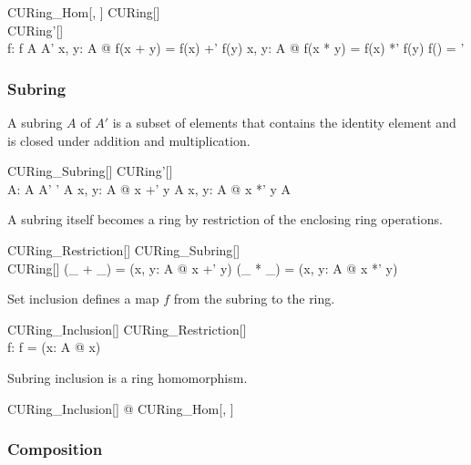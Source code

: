 \documentclass{amsart}
\begin{document}
\begin{schema}{CURing\_Hom}[\genT, \genU]
	CURing[\genT] \\
	CURing'[\genU] \\
	f: \genT \pfun \genU
\where
	f \in A \fun A'
\also
	\forall x, y: A @ f(x + y) = f(x) +' f(y)
\also
	\forall x, y: A @ f(x * y) = f(x) *' f(y)
\also
	f(\ringOne) = \ringOne'
\end{schema}

\subsubsection{Subring}

A subring $A$ of $A'$ is a subset of elements that contains the identity element and is closed under
addition and multiplication.

\begin{schema}{CURing\_Subring}[\genT]
	CURing'[\genT] \\
	A: \power \genT
\where
	A \subseteq A'
\also
	\ringOne' \in A
\also
	\forall x, y: A @ x +' y \in A
\also
	\forall x, y: A @ x *' y \in A	
\end{schema}

A subring itself becomes a ring by restriction of the enclosing ring operations.

\begin{schema}{CURing\_Restriction}[\genT]
	CURing\_Subring[\genT] \\
	CURing[\genT]
\where
	(\_ + \_) = (\lambda x, y: A @ x +' y)
\also
	(\_ * \_) = (\lambda x, y: A @ x *' y)
\end{schema}

Set inclusion defines a map $f$ from the subring to the ring.

\begin{schema}{CURing\_Inclusion}[\genT]
	CURing\_Restriction[\genT] \\
	f: \genT \pfun \genT
\where
	f = (\lambda x: A @ x)
\end{schema}

\begin{remark}
Subring inclusion is a ring homomorphism.

\begin{zed}
\forall CURing\_Inclusion[\setT] @ CURing\_Hom[\setT, \setT]
\end{zed}

\end{remark}

\subsubsection{Composition}
\end{document}
